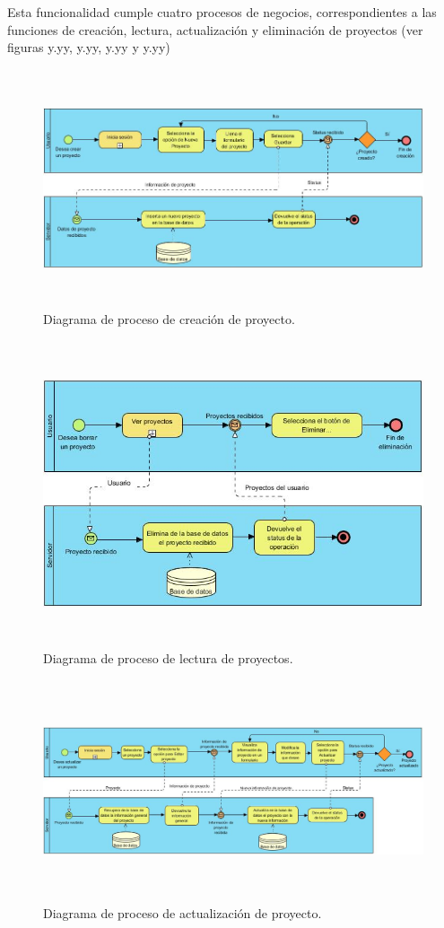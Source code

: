 Esta funcionalidad cumple cuatro procesos de negocios, correspondientes a las funciones de creación, lectura, actualización y eliminación de proyectos (ver figuras y.yy, y.yy, y.yy y y.yy)
\clearpage
\begin{figure}[h!]
	\centering
	\includegraphics[width=15cm,height=7cm]{imagenes/desarrollo/diagramas/BPMN_CREATE_PROJECT.jpg}
	\caption{Diagrama de proceso de creación de proyecto.}
	\label{fig:createproject}
\end{figure}
\begin{figure}[h!]
	\centering
	\includegraphics[width=15cm,height=9cm]{imagenes/desarrollo/diagramas/BPMN_READ_PROJECTS.jpg}
	\caption{Diagrama de proceso de lectura de proyectos.}
	\label{fig:readproject}
\end{figure}
\begin{figure}[h!]
	\centering
	\includegraphics[width=17cm,height=6.5cm]{imagenes/desarrollo/diagramas/BPMN_UPDATE_PROJECT.jpg}
	\caption{Diagrama de proceso de actualización de proyecto.}
	\label{fig:updateproject}
\end{figure}
